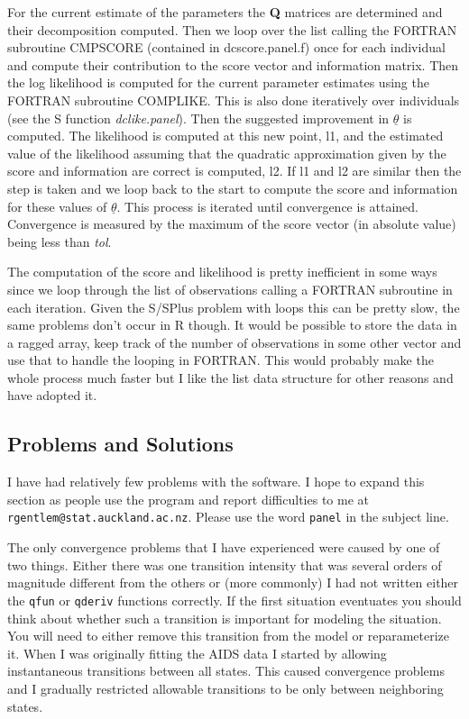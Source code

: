 \documentclass[12pt]{article}
\begin{document}
For the current estimate of the parameters the {\bf Q} matrices are 
determined and their decomposition computed.
Then we loop over the list calling the FORTRAN subroutine CMPSCORE
(contained in dcscore.panel.f) once for each individual and compute
their contribution to the score vector and information matrix.
Then the log likelihood is computed for the current parameter estimates
using the FORTRAN subroutine COMPLIKE. This is also done iteratively
over individuals (see the S function {\em dclike.panel}).
Then the suggested improvement in $\underline{\theta}$ is computed.
The likelihood is computed at this new point, l1, and the estimated value of
the likelihood assuming that the quadratic approximation given by the
score and information are correct is computed, l2. If l1 and l2 are 
similar then the step is taken and we loop back to the start to compute
the score and information for these values of $\underline{\theta}$.
This process is iterated until convergence is attained.
Convergence is measured by the maximum of the score vector (in absolute
value) being less than {\em tol}.

The computation of the score and likelihood is pretty inefficient 
in some ways since we loop through the list of
observations calling a FORTRAN subroutine in each iteration.
Given the S/SPlus problem with loops this can be pretty slow, the same problems
don't occur in R though.
It would be possible to store the data in a ragged array, keep track of the
number of observations in some other vector and use that to handle the 
looping in FORTRAN.
This would probably make the whole process much faster but I like the list
data structure for other reasons and have adopted it.

\subsection{Problems and Solutions}

I have had relatively few problems with the software. 
I hope to expand this section as people use the program and
report difficulties to me at \verb+rgentlem@stat.auckland.ac.nz+.
Please use the word \verb+panel+ in the subject line.

The only convergence problems that I have experienced were caused by one
of two things. Either there was one transition intensity that was several
orders of magnitude different from the others or (more commonly) I had
not written either the \verb+qfun+ or \verb+qderiv+ functions correctly.
If the first situation eventuates you should think about whether such a
transition is important for modeling the situation. You will need to either
remove this transition from the model or reparameterize it.
When I was originally fitting the AIDS data I started by allowing 
instantaneous transitions between all states. This caused convergence 
problems and I gradually restricted allowable transitions to be only
between neighboring states.
\end{document}
